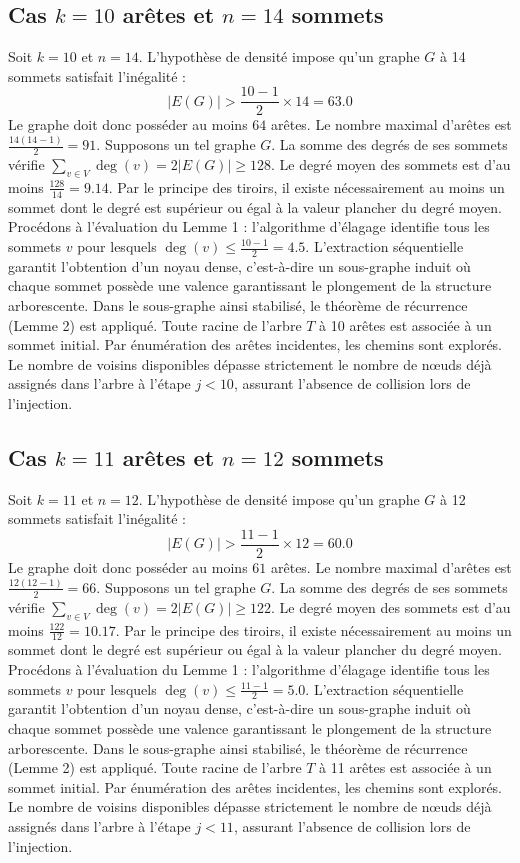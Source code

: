 \documentclass[12pt,a4paper]{article}
\begin{document}
\subsection{Cas $k = 10$ arêtes et $n = 14$ sommets}
Soit $k = 10$ et $n = 14$. L'hypothèse de densité impose qu'un graphe $G$ à 14 sommets satisfait l'inégalité :
$$ |E(G)| > \frac{10-1}{2} \times 14 = 63.0 $$
Le graphe doit donc posséder au moins $64$ arêtes. Le nombre maximal d'arêtes est $\frac{14(14-1)}{2} = 91$.
Supposons un tel graphe $G$. La somme des degrés de ses sommets vérifie $\sum_{v \in V} \deg(v) = 2|E(G)| \geq 128$.
Le degré moyen des sommets est d'au moins $\frac{128}{14} = 9.14$.
Par le principe des tiroirs, il existe nécessairement au moins un sommet dont le degré est supérieur ou égal à la valeur plancher du degré moyen.
Procédons à l'évaluation du Lemme 1 : l'algorithme d'élagage identifie tous les sommets $v$ pour lesquels $\deg(v) \leq \frac{10-1}{2} = 4.5$.
L'extraction séquentielle garantit l'obtention d'un noyau dense, c'est-à-dire un sous-graphe induit où chaque sommet possède une valence garantissant le plongement de la structure arborescente.
Dans le sous-graphe ainsi stabilisé, le théorème de récurrence (Lemme 2) est appliqué. Toute racine de l'arbre $T$ à 10 arêtes est associée à un sommet initial. Par énumération des arêtes incidentes, les chemins sont explorés. Le nombre de voisins disponibles dépasse strictement le nombre de nœuds déjà assignés dans l'arbre à l'étape $j < 10$, assurant l'absence de collision lors de l'injection.

\subsection{Cas $k = 11$ arêtes et $n = 12$ sommets}
Soit $k = 11$ et $n = 12$. L'hypothèse de densité impose qu'un graphe $G$ à 12 sommets satisfait l'inégalité :
$$ |E(G)| > \frac{11-1}{2} \times 12 = 60.0 $$
Le graphe doit donc posséder au moins $61$ arêtes. Le nombre maximal d'arêtes est $\frac{12(12-1)}{2} = 66$.
Supposons un tel graphe $G$. La somme des degrés de ses sommets vérifie $\sum_{v \in V} \deg(v) = 2|E(G)| \geq 122$.
Le degré moyen des sommets est d'au moins $\frac{122}{12} = 10.17$.
Par le principe des tiroirs, il existe nécessairement au moins un sommet dont le degré est supérieur ou égal à la valeur plancher du degré moyen.
Procédons à l'évaluation du Lemme 1 : l'algorithme d'élagage identifie tous les sommets $v$ pour lesquels $\deg(v) \leq \frac{11-1}{2} = 5.0$.
L'extraction séquentielle garantit l'obtention d'un noyau dense, c'est-à-dire un sous-graphe induit où chaque sommet possède une valence garantissant le plongement de la structure arborescente.
Dans le sous-graphe ainsi stabilisé, le théorème de récurrence (Lemme 2) est appliqué. Toute racine de l'arbre $T$ à 11 arêtes est associée à un sommet initial. Par énumération des arêtes incidentes, les chemins sont explorés. Le nombre de voisins disponibles dépasse strictement le nombre de nœuds déjà assignés dans l'arbre à l'étape $j < 11$, assurant l'absence de collision lors de l'injection.
\end{document}
